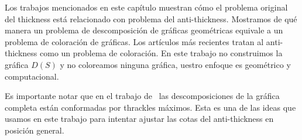Los trabajos mencionados en este capítulo muestran cómo el problema original del
thickness está relacionado con problema del anti-thickness. Mostramos de qué
manera un problema de descomposición de gráficas geométricas equivale
a un problema de coloración de gráficas. Los artículos más recientes tratan al
anti-thickness como un problema de coloración. En este trabajo no construimos la
gráfica $D(S)$ y no coloreamos ninguna gráfica, uestro enfoque es geométrico
y computacional.


Es importante notar que en el trabajo de~\cite{Fabila-Monroy2018} las
descomposiciones de la gráfica completa están conformadas por thrackles máximos. Esta es una de las ideas que usamos en este trabajo para intentar ajustar las cotas del anti-thickness en posición general.
